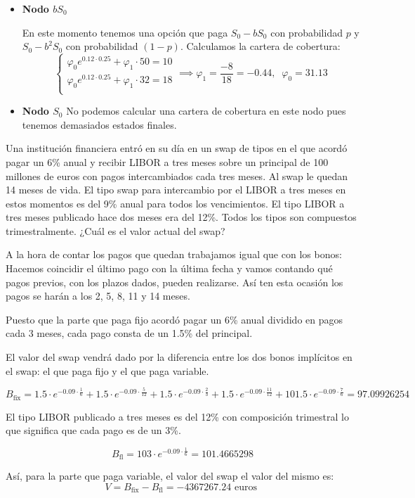 \begin{problem}[2]
\begin{itemize}
\item \textbf{Nodo $bS_0$}

En este momento tenemos una opción que paga $S_0-bS_0$ con probabilidad $p$ y $S_0-b^2S_0$ con probabilidad $(1-p)$. Calculamos la cartera de cobertura:
\[\left\{\begin{array}{l}
\varphi_0 e^{0.12\cdot 0.25}+\varphi_1 \cdot 50 = 10 \\
\varphi_0 e^{0.12\cdot 0.25}+\varphi_1 \cdot 32 = 18 \\
\end{array}\right. \implies \varphi_1 = \frac{-8}{18} = -0.44, \;\; \varphi_0 = 31.13\]

\item \textbf{Nodo $S_0$}
No podemos calcular una cartera de cobertura en este nodo pues tenemos demasiados estados finales.
\end{itemize}

\end{problem}

\begin{problem}[3]
Una institución financiera entró en su día en un swap de tipos en el que acordó pagar un 6\% anual y recibir LIBOR a tres meses sobre un principal de 100 millones de euros con pagos intercambiados cada tres meses. Al swap le quedan 14 meses de vida. El tipo swap para intercambio por el LIBOR a tres meses en estos momentos es del 9\% anual para todos los vencimientos. El tipo LIBOR a tres meses publicado hace dos meses era del 12\%. Todos los tipos son compuestos trimestralmente. ¿Cuál es el valor actual del swap?
\solution
{}

A la hora de contar los pagos que quedan trabajamos igual que con los bonos: Hacemos coincidir el último pago con la última fecha y vamos contando qué
pagos previos, con los plazos dados, pueden realizarse. Así ten esta ocasión los pagos se harán a los 2, 5, 8, 11 y 14 meses.

Puesto que la parte que paga fijo acordó pagar un 6\% anual dividido en pagos cada 3 meses, cada pago consta de un 1.5\% del principal.

El valor del swap vendrá dado por la diferencia entre los dos bonos implícitos en el swap: el que paga fijo y el que paga variable.

\[B_{\text{fix}} = 1.5\cdot e^{-0.09\cdot \frac{1}{6}} + 1.5\cdot e^{-0.09\cdot \frac{5}{12}} + 1.5\cdot e^{-0.09\cdot \frac{2}{3}} + 1.5\cdot e^{-0.09\cdot \frac{11}{12}} + 101.5\cdot e^{-0.09\cdot \frac{7}{6}} = 97.09926254\]

El tipo LIBOR publicado a tres meses es del 12\% con composición trimestral lo que significa que cada pago es de un 3\%.

\[B_{\text{fl}} = 103\cdot e^{-0.09\cdot \frac{1}{6}} = 101.4665298\]

Así, para la parte que paga variable, el valor del swap el valor del mismo es:
\[V = B_{\text{fix}} - B_{\text{fl}} = -4367267.24 \text{ euros }\]

\end{problem}

